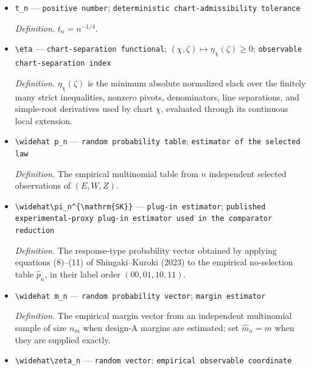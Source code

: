 \documentclass{article}
\begin{document}
\begin{itemize}
  \par\smallskip\noindent\emph{Definition.} \(d_{\chi}(z)=\inf\{\|z-u\|_2:u\text{ lies in the closure of the observable domain of chart }\chi\}\).
  \item \texttt{t\_\allowbreak{}n} --- \texttt{positive number}; \texttt{deterministic chart-\allowbreak{}admissibility tolerance}
  \par\smallskip\noindent\emph{Definition.} \(t_n=n^{-1/4}\).
  \item \texttt{\textbackslash{}\allowbreak{}eta} --- \texttt{chart-\allowbreak{}separation functional}; \((\chi,\zeta)\mapsto\eta_{\chi}(\zeta)\ge 0\); \texttt{observable chart-\allowbreak{}separation index}
  \par\smallskip\noindent\emph{Definition.} \(\eta_{\chi}(\zeta)\) is the minimum absolute normalized slack over the finitely many strict inequalities, nonzero pivots, denominators, line separations, and simple-root derivatives used by chart \(\chi\), evaluated through its continuous local extension.
  \item \texttt{\textbackslash{}\allowbreak{}widehat p\_\allowbreak{}n} --- \texttt{random probability table}; \texttt{estimator of the selected law}
  \par\smallskip\noindent\emph{Definition.} The empirical multinomial table from \(n\) independent selected observations of \((E,W,Z)\).
  \item \texttt{\textbackslash{}\allowbreak{}widehat\textbackslash{}\allowbreak{}pi\_\allowbreak{}n\textasciicircum{}\{\textbackslash{}\allowbreak{}mathrm\{SK\}\allowbreak{}\}\allowbreak{}} --- \texttt{plug-\allowbreak{}in estimator}; \texttt{published experimental-\allowbreak{}proxy plug-\allowbreak{}in estimator used in the comparator reduction}
  \par\smallskip\noindent\emph{Definition.} The response-type probability vector obtained by applying equations (8)--(11) of Shingaki--Kuroki (2023) to the empirical no-selection table \(\widehat p_n\), in their label order \((00,01,10,11)\).
  \item \texttt{\textbackslash{}\allowbreak{}widehat m\_\allowbreak{}n} --- \texttt{random probability vector}; \texttt{margin estimator}
  \par\smallskip\noindent\emph{Definition.} The empirical margin vector from an independent multinomial sample of size \(n_m\) when design-A margins are estimated; set \(\widehat m_n=m\) when they are supplied exactly.
  \item \texttt{\textbackslash{}\allowbreak{}widehat\textbackslash{}\allowbreak{}zeta\_\allowbreak{}n} --- \texttt{random vector}; \texttt{empirical observable coordinate}

\end{itemize}
\end{document}
